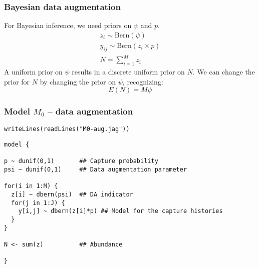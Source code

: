 \documentclass[color=usenames,dvipsnames]{beamer}\usepackage[]{graphicx}\usepackage[]{xcolor}
\makeatletter
\newcommand{\hlstr}[1]{\textcolor[rgb]{0.749,0.012,0.012}{#1}}%
\newcommand{\hlstd}[1]{\textcolor[rgb]{0,0,0}{#1}}%
\newcommand{\hlkwd}[1]{\textcolor[rgb]{0.004,0.004,0.506}{#1}}%
\newenvironment{kframe}{%
 \def\at@end@of@kframe{}%
 \ifinner\ifhmode%
  \def\at@end@of@kframe{\end{minipage}}%
  \begin{minipage}{\columnwidth}%
 \fi\fi%
 \def\FrameCommand##1{\hskip\@totalleftmargin \hskip-\fboxsep
 \colorbox{shadecolor}{##1}\hskip-\fboxsep
     \hskip-\linewidth \hskip-\@totalleftmargin \hskip\columnwidth}%
 \MakeFramed {\advance\hsize-\width
   \@totalleftmargin\z@ \linewidth\hsize
   \@setminipage}}%
 {\par\unskip\endMakeFramed%
 \at@end@of@kframe}
\newenvironment{knitrout}{}{} %
\makeatother
\begin{document}






\begin{frame}
  \frametitle{Bayesian data augmentation}
  For Bayesian inference, we need priors on $\psi$ and $p$. 
  \begin{gather*}
    z_i \sim \mathrm{Bern}(\psi) \\
    y_{ij} \sim \mathrm{Bern}(z_i \times p) \\
    N = \sum_{i=1}^M z_i
  \end{gather*}
  \vfill
  A uniform prior on $\psi$ results in a discrete uniform prior on
  $N$. We can change the prior for $N$ by changing the prior on  
  $\psi$, recognizing:
  \[
    E(N)=M\psi
  \]
\end{frame}



\begin{frame}[fragile]
  \frametitle{Model $M_0$ -- data augmentation}
\vspace{-3pt}
\begin{knitrout}\footnotesize
{}\color{fgcolor}\begin{kframe}
\begin{alltt}
\hlkwd{writeLines}\hlstd{(}\hlkwd{readLines}\hlstd{(}\hlstr{"M0-aug.jag"}\hlstd{))}
\end{alltt}
\begin{verbatim}
model {

p ~ dunif(0,1)       ## Capture probability
psi ~ dunif(0,1)     ## Data augmentation parameter

for(i in 1:M) {
  z[i] ~ dbern(psi)  ## DA indicator
  for(j in 1:J) {
    y[i,j] ~ dbern(z[i]*p) ## Model for the capture histories
  }
}

N <- sum(z)          ## Abundance

}
\end{verbatim}
\end{kframe}
\end{knitrout}
\end{frame}
\end{document}

